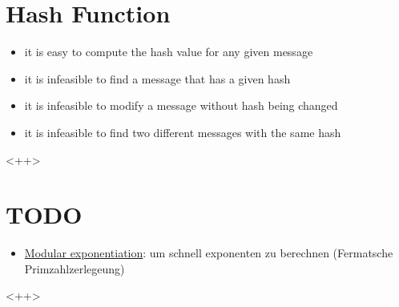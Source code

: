 \documentclass[a4paper]{article}
\begin{document}
\section{Hash Function}
\begin{itemize}
    \item it is easy to compute the hash value for any given message
    \item it is infeasible to find a message that has a given hash
    \item it is infeasible to modify a message without hash being changed
    \item it is infeasible to find two different messages with the same hash
\end{itemize}<++>


\section{TODO}

\begin{itemize}
    \item \href{http://en.wikipedia.org/wiki/Modular_exponentiation}{Modular exponentiation}: um schnell exponenten zu berechnen (Fermatsche Primzahlzerlegeung) 
\end{itemize}<++>
\end{document}

